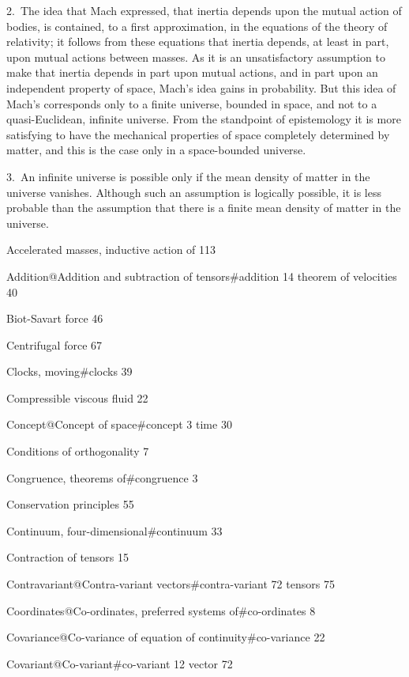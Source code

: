 \documentclass[12pt]{book}[2005/09/16]
\renewcommand{\cleardoublepage}{\clearpage}
\newcommand{\BookMark}[2]{\phantomsection\pdfbookmark[#1]{#2}{#2}}
\newcommand{\PrintIndex}{%
  \cleardoublepage
  \BookMark{-1}{Back Matter}
  \backmatter
  \printindex
}
\newcommand{\PageSep}[1]{\ignorespaces}
\begin{document}
2.~The idea that Mach expressed, that inertia depends
%
upon the mutual action of bodies, is contained, to a
first approximation, in the equations of the theory of
relativity; it follows from these equations that inertia
depends, at least in part, upon mutual actions between
masses. As it is an unsatisfactory assumption to make
that inertia depends in part upon mutual actions, and
in part upon an independent property of space, Mach's
idea gains in probability. But this idea of Mach's
corresponds only to a finite universe, bounded in space,
and not to a quasi-Euclidean, infinite universe. From
the standpoint of epistemology it is more satisfying to
have the mechanical properties of space completely determined
by matter, and this is the case only in a space-bounded
universe.

3.~An infinite universe is possible only if the mean
density of matter in the universe vanishes. Although
such an assumption is logically possible, it is less probable
than the assumption that there is a finite mean
density of matter in the universe.
\PageSep{120}
\PageSep{121}


\PrintIndex
\iffalse %

Accelerated masses, inductive action of 113

Addition@{Addition and subtraction of tensors}#addition 14
  theorem of velocities 40

Biot-Savart force 46

Centrifugal force 67

Clocks, moving#clocks 39

Compressible viscous fluid 22

Concept@{Concept of space}#concept 3
  time 30

Conditions of orthogonality 7

Congruence, theorems of#congruence 3

Conservation principles 55

Continuum, four-dimensional#continuum 33

Contraction of tensors 15

Contravariant@{Contra-variant vectors}#contra-variant 72
  tensors 75

Coordinates@{Co-ordinates, preferred systems of}#co-ordinates 8

Covariance@{Co-variance of equation of continuity}#co-variance 22

Covariant@{Co-variant}#co-variant 12 %
  vector 72
\end{document}
